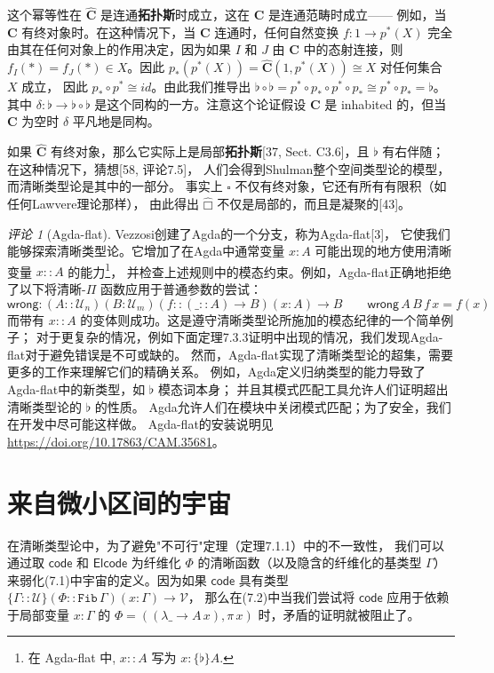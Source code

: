\documentclass{ctexrep}
\theoremstyle{plain}
\theoremstyle{definition}
\theoremstyle{remark}
\newtheorem{remark}[theorem]{评论}
\newcommand\hatcube{\widehat{□}}
\begin{document}
这个幂等性在 $\widehat{\mathbf{C}}$ 是连通\textbf{拓扑斯}时成立，这在 $\mathbf{C}$ 是连通范畴时成立——
例如，当 $\mathbf{C}$ 有终对象时。在这种情况下，当 $\mathbf{C}$ 连通时，任何自然变换 
$f : 1 \to p^*(X)$ 完全由其在任何对象上的作用决定，因为如果 $I$ 和 $J$ 由 
$\mathbf{C}$ 中的态射连接，则 $f_I(*) = f_J(*) \in X$。因此 
$p_*(p^*(X)) = \widehat{\mathbf{C}}(1, p^*(X)) \cong X$ 对任何集合 $X$ 成立，
因此 $p_* \circ p^* \cong  id $。由此我们推导出 
$\flat \circ \flat = p^* \circ p_* \circ p^* \circ p_* \cong p^* \circ p_* = \flat$。
其中 $\delta : \flat \to \flat \circ \flat$ 是这个同构的一方。注意这个论证假设 
$\mathbf{C}$ 是 inhabited 的，但当 $\mathbf{C}$ 为空时 $\delta$ 平凡地是同构。

如果 $\widehat{\mathbf{C}}$ 有终对象，那么它实际上是局部\textbf{拓扑斯}[37, Sect. C3.6]，且 $\flat$ 有右伴随；在这种情况下，猜想[58, 评论7.5]，
人们会得到Shulman整个空间类型论的模型，而清晰类型论是其中的一部分。
事实上 $\square$ 不仅有终对象，它还有所有有限积（如任何Lawvere理论那样），
由此得出 $\hatcube$ 不仅是局部的，而且是凝聚的[43]。

\begin{remark}[Agda-flat]
Vezzosi创建了Agda的一个分支，称为Agda-flat[3]，
它使我们能够探索清晰类型论。它增加了在Agda中通常变量 $x : A$ 可能出现的地方使用清晰变量 $x :: A$ 的能力\footnote{在 Agda-flat 中, $x::A$ 写为 $x:\{\flat\}A$.}，
并检查上述规则中的模态约束。例如，Agda-flat正确地拒绝了以下将清晰-$\Pi$ 函数应用于普通参数的尝试：
\[
\mathsf{wrong} : (A :: \mathcal{U}_n)(B : \mathcal{U}_m)(f :: (\_ :: A) \to B)(x : A) \to B \qquad 
\mathsf{wrong}\,A\,B\,f\,x = f(x)
\]
而带有 $x :: A$ 的变体则成功。这是遵守清晰类型论所施加的模态纪律的一个简单例子；
对于更复杂的情况，例如下面定理7.3.3证明中出现的情况，我们发现Agda-flat对于避免错误是不可或缺的。
然而，Agda-flat实现了清晰类型论的超集，需要更多的工作来理解它们的精确关系。
例如，Agda定义归纳类型的能力导致了Agda-flat中的新类型，如 $\flat$ 模态词本身；
并且其模式匹配工具允许人们证明超出清晰类型论的 $\flat$ 的性质。
Agda允许人们在模块中关闭模式匹配；为了安全，我们在开发中尽可能这样做。
Agda-flat的安装说明见 \url{https://doi.org/10.17863/CAM.35681}。
\end{remark}


\section{来自微小区间的宇宙}

在清晰类型论中，为了避免"不可行"定理（定理7.1.1）中的不一致性，
我们可以通过取 $\mathsf{code}$ 和 $\mathsf{Elcode}$ 为纤维化 $\Phi$ 的清晰函数（以及隐含的纤维化的基类型 $\Gamma$）
来弱化(7.1)中宇宙的定义。因为如果 $\mathsf{code}$ 具有类型 
$\{\Gamma :: \mathcal{U}\}(\Phi :: \mathtt{Fib}\,\Gamma)(x : \Gamma) \to \mathcal{V}$，
那么在(7.2)中当我们尝试将 $\mathsf{code}$ 应用于依赖于局部变量 $x : \Gamma$ 的 
$\Phi = ((\lambda\_ \to A\,x), \pi\,x)$ 时，矛盾的证明就被阻止了。
\end{document}
